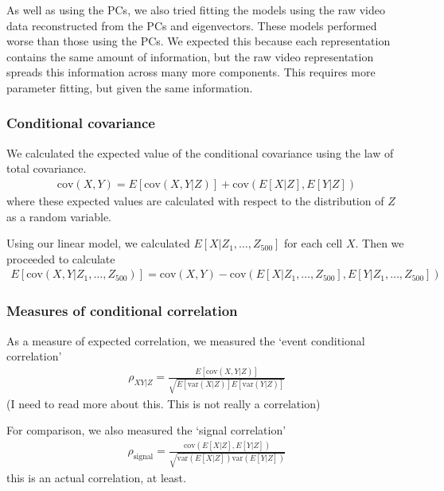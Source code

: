 \documentclass[a4paper,12pt]{article}
\theoremstyle{definition}
\newcommand{\cov}{\text{cov}} %
\newcommand{\var}{\text{var}} %
\begin{document}
        As well as using the PCs, we also tried fitting the models using the raw video data reconstructed from the PCs and eigenvectors. These models performed worse than those using the PCs. We expected this because each representation contains the same amount of information, but the raw video representation spreads this information across many more components. This requires more parameter fitting, but given the same information. 

        \subsubsection{Conditional covariance}
        We calculated the expected value of the conditional covariance using the law of total covariance.
        \begin{align}\label{eq:law_of_total_covariance}
            \cov (X,Y) = E[ \cov(X,Y|Z)] + \cov(E[X|Z], E[Y|Z])
        \end{align}
        where these expected values are calculated with respect to the distribution of $Z$ as a random variable.

        Using our linear model, we calculated $E[X|Z_1,\dots, Z_{500}]$ for each cell $X$. Then we proceeded to calculate
        \begin{align}
            E[\cov(X,Y|Z_1,\dots, Z_{500})] = \cov(X,Y) - \cov(E[X|Z_1,\dots, Z_{500}], E[Y|Z_1,\dots, Z_{500}])
        \end{align}

        \subsubsection{Measures of conditional correlation}
        As a measure of expected correlation, we measured the `event conditional correlation' \cite{maugis}
        \begin{align}\label{eq:event_conditional_correlation}
            \rho_{XY|Z} = \frac{E[\cov(X,Y|Z)]}{\sqrt{E[\var(X|Z)]E[\var(Y|Z)]}}
        \end{align}
        (I need to read more about this. This is not really a correlation)

        For comparison, we also measured the `signal correlation'
        \begin{align}\label{eq:signal_correlation}
            \rho_{\text{signal}} = \frac{\cov(E[X|Z], E[Y|Z])}{\sqrt{\var(E[X|Z])\var(E[Y|Z])}}
        \end{align}
        this is an actual correlation, at least.
        
\end{document}
